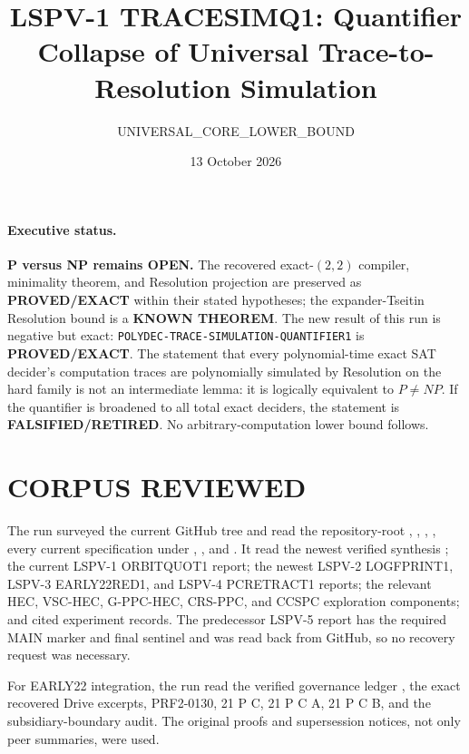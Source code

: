 \documentclass[11pt]{article}
\title{LSPV-1 TRACESIMQ1: Quantifier Collapse of Universal Trace-to-Resolution Simulation}
\author{UNIVERSAL\_CORE\_LOWER\_BOUND}
\date{13 October 2026}
\begin{document}
\maketitle

\paragraph{Executive status.}
\textbf{P versus NP remains OPEN.}
The recovered exact-$(2,2)$ compiler, minimality theorem, and Resolution
projection are preserved as \textbf{PROVED/EXACT} within their stated
hypotheses; the expander-Tseitin Resolution bound is a \textbf{KNOWN
THEOREM}.  The new result of this run is negative but exact:
\texttt{POLYDEC-TRACE-SIMULATION-QUANTIFIER1} is \textbf{PROVED/EXACT}.
The statement that every polynomial-time exact SAT decider's computation
traces are polynomially simulated by Resolution on the hard family is not an
intermediate lemma: it is logically equivalent to $P\ne NP$.  If the
quantifier is broadened to all total exact deciders, the statement is
\textbf{FALSIFIED/RETIRED}.  No arbitrary-computation lower bound follows.

\section{CORPUS REVIEWED}
The run surveyed the current GitHub tree and read the repository-root
, , ,
, every current specification under
, , and .  It read the newest
verified synthesis
; the current
LSPV-1 ORBITQUOT1 report; the newest LSPV-2 LOGFPRINT1, LSPV-3 EARLY22RED1,
and LSPV-4 PCRETRACT1 reports; the relevant HEC, VSC-HEC, G-PPC-HEC,
CRS-PPC, and CCSPC exploration components; and cited experiment records.
The predecessor LSPV-5 report has the required MAIN marker and final sentinel
and was read back from GitHub, so no recovery request was necessary.

For EARLY22 integration, the run read the verified governance ledger
, the
exact recovered Drive excerpts, PRF2-0130, 21 P C, 21 P C A, 21 P C B, and
the subsidiary-boundary audit.  The original proofs and supersession notices,
not only peer summaries, were used.
\end{document}
